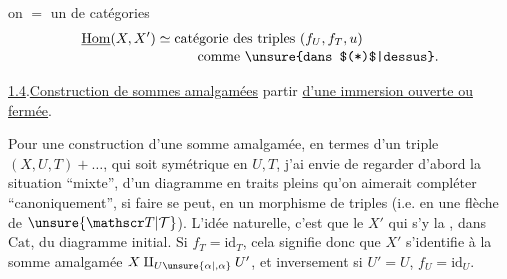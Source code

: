  on  $=$ un  de
catégories
\[
\begin{aligned}
\underline{\operatorname{Hom}}(X,X')&\simeq\text{catégorie des triples }(f_U,f_T,u)\\[-2pt]
&\hspace{3em}\text{comme \unsure{dans $(*)$|dessus}}.
\end{aligned}
\]

\uline{1.4}.\quad \uline{Construction de sommes amalgamées}  partir
\uline{d'une immersion ouverte ou fermée}.

Pour une construction d'une  somme
amalgamée, en termes d'un triple $(X,U,T)+\ldots$,
qui soit symétrique en $U,T$, j'ai envie
de regarder d'abord la situation ``mixte'', d'un
diagramme en traits pleins
qu'on aimerait compléter ``canoniquement'', si faire
se peut, en un morphisme de triples (i.e. en
une flèche de $\unsure{\mathscr T|\mathcal T}$). L'idée naturelle,
c'est que le $X'$ qui s'y  
la  , dans $\mathrm{Cat}$, du diagramme
initial. Si  $f_T=\mathrm{id}_T$, cela signifie donc
que $X'$ s'identifie à la somme amalgamée
$X\amalg_{U\unsure{\alpha|{,}\alpha}}U'$, et inversement si $U'=U$, $f_U=\mathrm{id}_U$.

